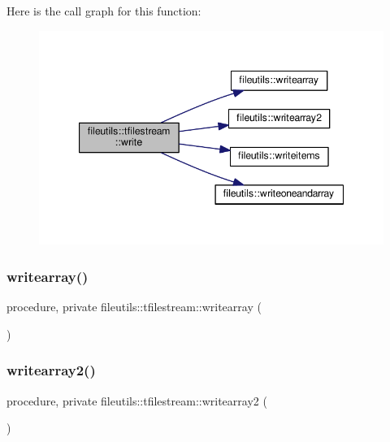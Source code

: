 Here is the call graph for this function\+:
\nopagebreak
\begin{figure}[H]
\begin{center}
\leavevmode
\includegraphics[width=344pt]{structfileutils_1_1tfilestream_afac6692bb5fad57e18abea90570da6d3_cgraph}
\end{center}
\end{figure}
\mbox{\label{structfileutils_1_1tfilestream_a954749d040cadd592bd5c55b7938f14a}} 
\subsubsection{\texorpdfstring{writearray()}{writearray()}}
{\footnotesize\ttfamily procedure, private fileutils\+::tfilestream\+::writearray (\begin{DoxyParamCaption}{ }\end{DoxyParamCaption})\hspace{0.3cm}{\ttfamily [private]}}

\mbox{\label{structfileutils_1_1tfilestream_aa034c1872f9474a8cfa169e6ae70e2e1}} 
\subsubsection{\texorpdfstring{writearray2()}{writearray2()}}
{\footnotesize\ttfamily procedure, private fileutils\+::tfilestream\+::writearray2 (\begin{DoxyParamCaption}{ }\end{DoxyParamCaption})\hspace{0.3cm}{\ttfamily [private]}}

